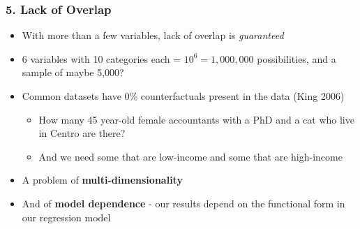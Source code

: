 \documentclass[xcolor=x11names,compress]{beamer}\usepackage[]{graphicx}\usepackage[]{color}
\renewcommand{\(}{\begin{columns}}
\renewcommand{\)}{\end{columns}}
\newcommand{\<}[1]{\begin{column}{#1}}
\renewcommand{\>}{\end{column}}
\begin{document}
\begin{frame}
\frametitle{5. Lack of Overlap}
\begin{itemize}
\item With more than a few variables, lack of overlap is \textit{guaranteed}
\item 6 variables with 10 categories each = $10^6 = 1,000,000$ possibilities, and a sample of maybe 5,000?
\item Common datasets have 0\% counterfactuals present in the data (King 2006)
\begin{itemize}
\item How many 45 year-old female accountants with a PhD and a cat who live in Centro are there?
\item And we need some that are low-income and some that are high-income
\end{itemize}
\item A problem of \textbf{multi-dimensionality}
\item And of \textbf{model dependence} - our results depend on the functional form in our regression model
\end{itemize}
\end{frame}



\end{document}
